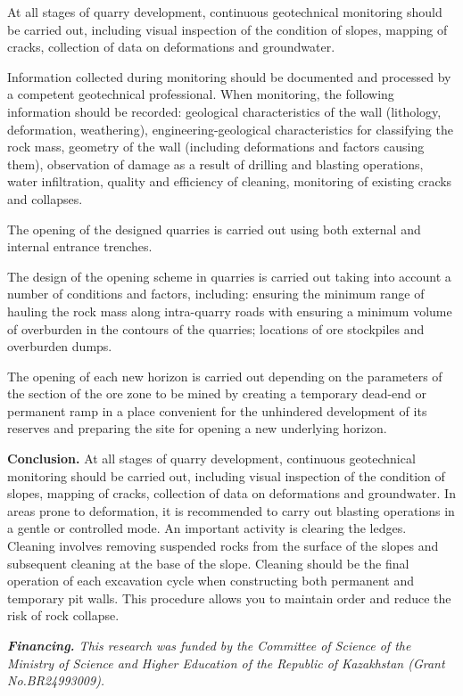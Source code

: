 At all stages of quarry development, continuous geotechnical monitoring
should be carried out, including visual inspection of the condition of
slopes, mapping of cracks, collection of data on deformations and
groundwater.

Information collected during monitoring should be documented and
processed by a competent geotechnical professional. When monitoring, the
following information should be recorded: geological characteristics of
the wall (lithology, deformation, weathering), engineering-geological
characteristics for classifying the rock mass, geometry of the wall
(including deformations and factors causing them), observation of damage
as a result of drilling and blasting operations, water infiltration,
quality and efficiency of cleaning, monitoring of existing cracks and
collapses.

The opening of the designed quarries is carried out using both external
and internal entrance trenches.

The design of the opening scheme in quarries is carried out taking into
account a number of conditions and factors, including: ensuring the
minimum range of hauling the rock mass along intra-quarry roads with
ensuring a minimum volume of overburden in the contours of the quarries;
locations of ore stockpiles and overburden dumps.

The opening of each new horizon is carried out depending on the
parameters of the section of the ore zone to be mined by creating a
temporary dead-end or permanent ramp in a place convenient for the
unhindered development of its reserves and preparing the site for
opening a new underlying horizon.

{\bfseries Conclusion.} At all stages of quarry development, continuous
geotechnical monitoring should be carried out, including visual
inspection of the condition of slopes, mapping of cracks, collection of
data on deformations and groundwater. In areas prone to deformation, it
is recommended to carry out blasting operations in a gentle or
controlled mode. An important activity is clearing the ledges. Cleaning
involves removing suspended rocks from the surface of the slopes and
subsequent cleaning at the base of the slope. Cleaning should be the
final operation of each excavation cycle when constructing both
permanent and temporary pit walls. This procedure allows you to maintain
order and reduce the risk of rock collapse.

\emph{{\bfseries Financing.} This research was funded by the Committee of
Science of the Ministry of Science and Higher Education of the Republic
of Kazakhstan (Grant No.BR24993009).}

